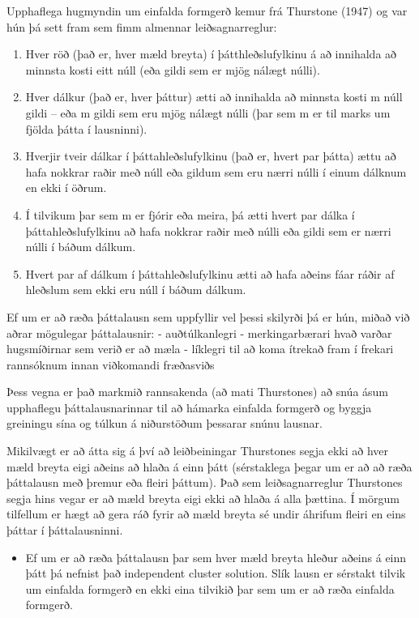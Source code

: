 \documentclass[]{book}
\providecommand{\tightlist}{%
  \setlength{\itemsep}{0pt}\setlength{\parskip}{0pt}}
\begin{document}
Upphaflega hugmyndin um einfalda formgerð kemur frá Thurstone (1947) og var hún þá sett fram sem fimm almennar leiðsagnarreglur:

\begin{enumerate}
\def\labelenumi{\arabic{enumi})}
\tightlist
\item
  Hver röð (það er, hver mæld breyta) í þátthleðslufylkinu á að innihalda að minnsta kosti eitt núll (eða gildi sem er mjög nálægt núlli).
\item
  Hver dálkur (það er, hver þáttur) ætti að innihalda að minnsta kosti m núll gildi -- eða m gildi sem eru mjög nálægt núlli (þar sem m er til marks um fjölda þátta í lausninni).
\item
  Hverjir tveir dálkar í þáttahleðslufylkinu (það er, hvert par þátta) ættu að hafa nokkrar raðir með núll eða gildum sem eru nærri núlli í einum dálknum en ekki í öðrum.
\item
  Í tilvikum þar sem m er fjórir eða meira, þá ætti hvert par dálka í þáttahleðslufylkinu að hafa nokkrar raðir með núlli eða gildi sem er nærri núlli í báðum dálkum.
\item
  Hvert par af dálkum í þáttahleðslufylkinu ætti að hafa aðeins fáar ráðir af hleðslum sem ekki eru núll í báðum dálkum.
\end{enumerate}

Ef um er að ræða þáttalausn sem uppfyllir vel þessi skilyrði þá er hún, miðað við aðrar mögulegar þáttalausnir:
- auðtúlkanlegri
- merkingarbærari hvað varðar hugsmíðirnar sem verið er að mæla
- líklegri til að koma ítrekað fram í frekari rannsóknum innan viðkomandi fræðasviðs

Þess vegna er það markmið rannsakenda (að mati Thurstones) að snúa ásum upphaflegu þáttalausnarinnar til að hámarka einfalda formgerð og byggja greiningu sína og túlkun á niðurstöðum þessarar snúnu lausnar.

Mikilvægt er að átta sig á því að leiðbeiningar Thurstones segja ekki að hver mæld breyta eigi aðeins að hlaða á einn þátt (sérstaklega þegar um er að að ræða þáttalausn með þremur eða fleiri þáttum). Það sem leiðsagnarreglur Thurstones segja hins vegar er að mæld breyta eigi ekki að hlaða á alla þættina. Í mörgum tilfellum er hægt að gera ráð fyrir að mæld breyta sé undir áhrifum fleiri en eins þáttar í þáttalausninni.

\begin{itemize}
\tightlist
\item
  Ef um er að ræða þáttalausn þar sem hver mæld breyta hleður aðeins á einn þátt þá nefnist það independent cluster solution. Slík lausn er sérstakt tilvik um einfalda formgerð en ekki eina tilvikið þar sem um er að ræða einfalda formgerð.
\end{itemize}
\end{document}
